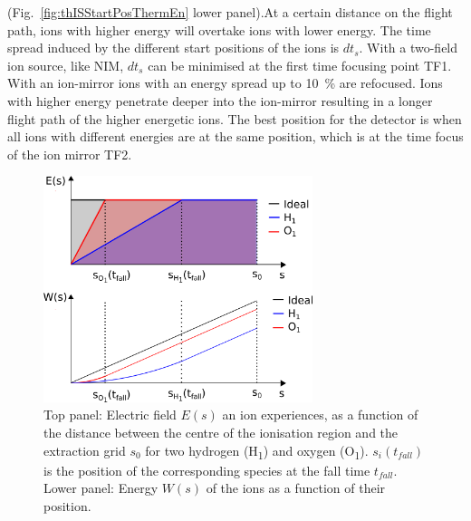 	(Fig.~\ref{fig:thISStartPosThermEn} lower panel).At a certain distance on the flight path, ions with higher energy will overtake ions with lower energy. The time spread induced by the different start positions of the ions is $dt_{s}$. With a two-field ion source, like NIM, $dt_s$ can be minimised at the first time focusing point TF1. With an ion-mirror ions with an energy spread up to 10~\% are refocused. Ions with higher energy penetrate deeper into the ion-mirror resulting in a longer flight path of the higher energetic ions. The best position for the detector is when all ions with different energies are at the same position, which is at the time focus of the ion mirror TF2.\\
	
	\begin{figure}[h!] %
		\centering
		\includegraphics[width= 0.7\textwidth]{Bilder/PulsInt.png}
		\caption{Top panel: Electric field $E(s)$ an ion experiences, as a function of the distance between the centre of the ionisation region and the extraction grid $s_0$ for two hydrogen (H\textsubscript{1}) and oxygen (O\textsubscript{1}). $s_i(t_{fall})$ is the position of the corresponding species at the fall time $t_{fall}$. Lower panel: Energy $W(s)$ of the ions as a function of their position.}
		\label{fig:PulsInt}
	\end{figure}
	
